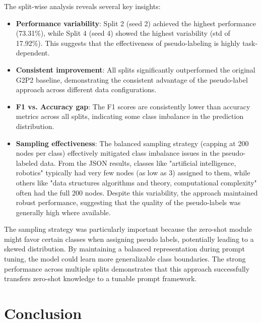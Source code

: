 \documentclass[10pt,conference]{IEEEtran}
\begin{document}
The split-wise analysis reveals several key insights:

\begin{itemize}
    \item \textbf{Performance variability}: Split 2 (seed 2) achieved the highest performance (73.31\%), while Split 4 (seed 4) showed the highest variability (std of 17.92\%). This suggests that the effectiveness of pseudo-labeling is highly task-dependent.
    
    \item \textbf{Consistent improvement}: All splits significantly outperformed the original G2P2 baseline, demonstrating the consistent advantage of the pseudo-label approach across different data configurations.
    
    \item \textbf{F1 vs. Accuracy gap}: The F1 scores are consistently lower than accuracy metrics across all splits, indicating some class imbalance in the prediction distribution.
    
    \item \textbf{Sampling effectiveness}: The balanced sampling strategy (capping at 200 nodes per class) effectively mitigated class imbalance issues in the pseudo-labeled data. From the JSON results, classes like "artificial intelligence, robotics" typically had very few nodes (as low as 3) assigned to them, while others like "data structures algorithms and theory, computational complexity" often had the full 200 nodes. Despite this variability, the approach maintained robust performance, suggesting that the quality of the pseudo-labels was generally high where available.
\end{itemize}

The sampling strategy was particularly important because the zero-shot module might favor certain classes when assigning pseudo labels, potentially leading to a skewed distribution. By maintaining a balanced representation during prompt tuning, the model could learn more generalizable class boundaries. The strong performance across multiple splits demonstrates that this approach successfully transfers zero-shot knowledge to a tunable prompt framework.

\section{Conclusion}
\end{document}
